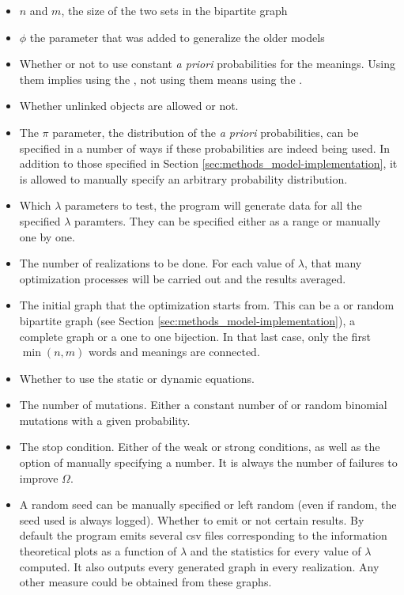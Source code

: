 \begin{itemize}
\item
  $n$ and $m$, the size of the two sets in the bipartite graph
\item
  $\phi$ the parameter that was added to generalize the older models
\item
  Whether or not to use constant \emph{a priori} probabilities for the meanings.
  Using them implies using the \secondmodel{}, not using them means using the \firstmodel{}.
\item
  Whether unlinked objects are allowed or not.
\item
  The $\pi$ parameter, the distribution of the \emph{a priori} probabilities, can be specified in a number of ways if these probabilities are indeed being used.
  In addition to those specified in Section \ref{sec:methods_model-implementation}, it is allowed to manually specify an arbitrary probability distribution.
\item
  Which $\lambda$ parameters to test, the program will generate data for all the specified $\lambda$ paramters.
 They can be specified either as a range or manually one by one.
\item
  The number of realizations to be done.
  For each value of $\lambda$, that many optimization processes will be carried out and the results averaged.
\item
  The initial graph that the optimization starts from.
  This can be a  or  random bipartite graph (see Section \ref{sec:methods_model-implementation}), a complete graph or a one to one bijection.
  In that last case, only the first $\min(n,m)$ words and meanings are connected.
\item
  Whether to use the static or dynamic equations.
\item
  The number of mutations.
  Either a constant number of or random binomial mutations with a given probability.
\item
  The stop condition.
  Either of the weak or strong conditions, as well as the option of manually specifying a number.
  It is always the number of failures to improve $\Omega$.
\item
  A random seed can be manually specified or left random (even if random, the seed used is always logged).
  Whether to emit or not certain results.
  By default the program emits several csv files corresponding to the information theoretical plots as a function of $\lambda$ and the statistics for every value of $\lambda$ computed.
  It also outputs every generated graph in every realization.
  Any other measure could be obtained from these graphs.
\end{itemize}

